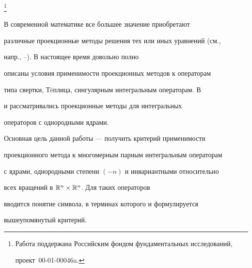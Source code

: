 \thanks{Работа поддержана Российским фондом фундаментальных исследований,


проект \No\,00-01-00046a.}





\date{}




\pagestyle{plain} %







\maketitle


\label{begin}

















В современной математике все большее значение приобретают


различные проекционные методы решения тех или иных уравнений (см.,


напр., \cite{b1}--\cite{b3}). В настоящее время довольно полно


описаны условия применимости проекционных методов к операторам


типа свертки, Т\"eплица, сингулярным интегральным операторам. В


\cite{b4} и \cite{b5} рассматривались проекционные методы для интегральных


операторов с однородными ядрами.





Основная цель данной работы --- получить критерий применимости


проекционного метода к многомерным парным интегральным операторам


с ядрами, однородными степени $(-n)$ и инвариантными относительно


всех вращений в $\Bbb R^n\times\Bbb R^n$. Для таких операторов


вводится понятие символа, в терминах которого и формулируется


вышеупомянутый критерий.





